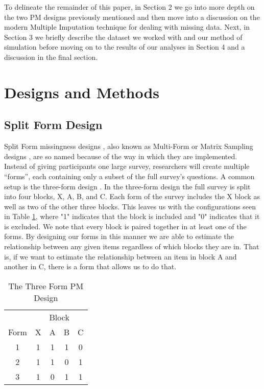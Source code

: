\documentclass{svjour3}                     %
\begin{document}
To delineate the remainder of this paper, in Section 2 we go into more depth on the two PM designs previously mentioned and then move into a discussion on the modern Multiple Imputation technique for dealing with missing data. Next, in Section 3 we briefly describe the dataset we worked with and our method of simulation before moving on to the results of our analyses in Section 4 and a discussion in the final section. \par

\section{Designs and Methods}
\label{sec:1}
\subsection{Split Form Design}
\label{sec:1.1}

Split Form missingness designs \citep{raghunathan1995split}, also  known as Multi-Form \citep{little2013planned} or Matrix Sampling designs \citep{thomas2006evaluation}, are so named because of the way in which they are implemented. Instead of giving participants one large survey, researchers will create multiple “forms”, each containing only a subset of the full survey’s questions. A common setup is the three-form design \citep{graham1996maximizing}. In the three-form design the full survey is split into four blocks, X, A, B, and C. Each form of the survey includes the X block as well as two of the other three blocks. This leaves us with the configurations seen in Table \ref{tab:table10}, where "1" indicates that the block is included and "0" indicates that it is excluded. We note that every block is paired together in at least one of the forms. By designing our forms in this manner we are able to estimate the relationship between any given items regardless of which blocks they are in. That is, if we want to estimate the relationship between an item in block A and another in C, there is a form that allows us to do that. \par

\begin{table}[h!]
	\centering
	\caption{The Three Form PM Design}
	\label{tab:table10}
	\setlength{\tabcolsep}{1cm}
	\begin{tabular}{c|cccc}
		\toprule
		& \multicolumn{4}{c}{Block} \\
		Form & X & A & B & C \\
		\midrule
		1 & 1 & 1 & 1 & 0 \\
		2 & 1 & 1 & 0 & 1 \\
		3 & 1 & 0 & 1 & 1 \\
		\bottomrule
	\end{tabular}
\end{table}
\end{document}
